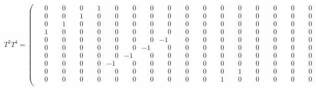 \documentclass[10pt]{article}
\begin{document}
\[
T^{2}T^{4} = \left(\begin{smallmatrix}
\phantom{-}0 & \phantom{-}0 & \phantom{-}0 & \phantom{-}1 & \phantom{-}0 & \phantom{-}0 & \phantom{-}0 & \phantom{-}0 & \phantom{-}0 & \phantom{-}0 & \phantom{-}0 & \phantom{-}0 & \phantom{-}0 & \phantom{-}0 & \phantom{-}0 & \phantom{-}0 \\
\phantom{-}0 & \phantom{-}0 & \phantom{-}1 & \phantom{-}0 & \phantom{-}0 & \phantom{-}0 & \phantom{-}0 & \phantom{-}0 & \phantom{-}0 & \phantom{-}0 & \phantom{-}0 & \phantom{-}0 & \phantom{-}0 & \phantom{-}0 & \phantom{-}0 & \phantom{-}0 \\
\phantom{-}0 & \phantom{-}1 & \phantom{-}0 & \phantom{-}0 & \phantom{-}0 & \phantom{-}0 & \phantom{-}0 & \phantom{-}0 & \phantom{-}0 & \phantom{-}0 & \phantom{-}0 & \phantom{-}0 & \phantom{-}0 & \phantom{-}0 & \phantom{-}0 & \phantom{-}0 \\
\phantom{-}1 & \phantom{-}0 & \phantom{-}0 & \phantom{-}0 & \phantom{-}0 & \phantom{-}0 & \phantom{-}0 & \phantom{-}0 & \phantom{-}0 & \phantom{-}0 & \phantom{-}0 & \phantom{-}0 & \phantom{-}0 & \phantom{-}0 & \phantom{-}0 & \phantom{-}0 \\
\phantom{-}0 & \phantom{-}0 & \phantom{-}0 & \phantom{-}0 & \phantom{-}0 & \phantom{-}0 & \phantom{-}0 & -1 & \phantom{-}0 & \phantom{-}0 & \phantom{-}0 & \phantom{-}0 & \phantom{-}0 & \phantom{-}0 & \phantom{-}0 & \phantom{-}0 \\
\phantom{-}0 & \phantom{-}0 & \phantom{-}0 & \phantom{-}0 & \phantom{-}0 & \phantom{-}0 & -1 & \phantom{-}0 & \phantom{-}0 & \phantom{-}0 & \phantom{-}0 & \phantom{-}0 & \phantom{-}0 & \phantom{-}0 & \phantom{-}0 & \phantom{-}0 \\
\phantom{-}0 & \phantom{-}0 & \phantom{-}0 & \phantom{-}0 & \phantom{-}0 & -1 & \phantom{-}0 & \phantom{-}0 & \phantom{-}0 & \phantom{-}0 & \phantom{-}0 & \phantom{-}0 & \phantom{-}0 & \phantom{-}0 & \phantom{-}0 & \phantom{-}0 \\
\phantom{-}0 & \phantom{-}0 & \phantom{-}0 & \phantom{-}0 & -1 & \phantom{-}0 & \phantom{-}0 & \phantom{-}0 & \phantom{-}0 & \phantom{-}0 & \phantom{-}0 & \phantom{-}0 & \phantom{-}0 & \phantom{-}0 & \phantom{-}0 & \phantom{-}0 \\
\phantom{-}0 & \phantom{-}0 & \phantom{-}0 & \phantom{-}0 & \phantom{-}0 & \phantom{-}0 & \phantom{-}0 & \phantom{-}0 & \phantom{-}0 & \phantom{-}0 & \phantom{-}0 & \phantom{-}1 & \phantom{-}0 & \phantom{-}0 & \phantom{-}0 & \phantom{-}0 \\
\phantom{-}0 & \phantom{-}0 & \phantom{-}0 & \phantom{-}0 & \phantom{-}0 & \phantom{-}0 & \phantom{-}0 & \phantom{-}0 & \phantom{-}0 & \phantom{-}0 & \phantom{-}1 & \phantom{-}0 & \phantom{-}0 & \phantom{-}0 & \phantom{-}0 & \phantom{-}0 \\

\end{smallmatrix}\]
\end{document}
